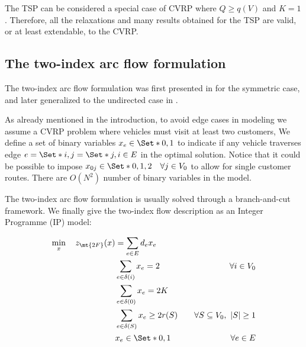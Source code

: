 The TSP can be considered a special case of CVRP where $Q \ge q(V)$ and $K = 1$.
Therefore, all the relaxations and many results obtained for the TSP are valid, or at least extendable, to the CVRP.

\subsection{The two-index arc flow formulation}
\label{sec:intro-cvrp-two-index-flow-formulation}

The two-index arc flow formulation was first presented in \cite{laporte1983, laporte1985} for the symmetric case,
and later generalized to the undirected case in \cite{laporte1986}.

As already mentioned in the introduction,
to avoid edge cases in modeling we assume a CVRP problem where
vehicles must visit at least two customers,
We define a set of binary variables $x_e \in \Set*{0, 1}$ to indicate if any vehicle traverses
edge $e = \Set*{i, j} = \Set*{j, i} \in E$ in the optimal solution.
Notice that it could be possible to impose $x_{0j} \in \Set*{0, 1, 2} \quad \forall j \in V_0$
to allow for single customer routes.
There are $O(N^2)$ number of binary variables in the model.

The two-index arc flow formulation is usually solved through a branch-and-cut framework.
We finally give the two-index flow description as an Integer Programme (IP) model:



\begin{align}
	\min_{x} \quad z_\mt{2F}(x) & = \sum_{e \in E} d_e x_e \label{eq:two-index-flow-obj-func}                                                                                     \\
	                            & \sum_{e \in \delta(i)} x_e = 2                                  & \quad \forall i \in V_0 \label{eq:two-index-flow-two-edges-incident-per-customer} \\
                                & \sum_{e \in \delta(0)} x_e = 2 K                                           & \label{eq:two-index-flow-two-k-edges-incident-in-the-depot-node}                  \\
	                            & \sum_{e \in \delta(S)} x_e \ge 2 r(S)                           & \quad \forall S \subseteq V_0,\ |S| \ge 1 \label{eq:two-index-flow-ccc}           \\
	                            & x_e                   \in \Set*{0, 1}                                & \quad \forall e \in E \label{eq:two-index-flow-x-mip-var-bounds}
\end{align}

